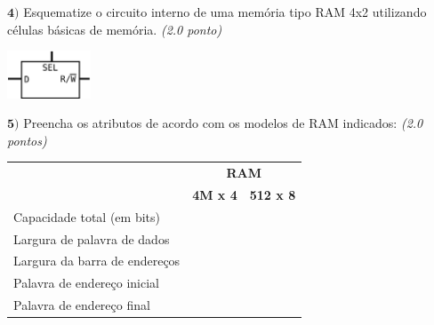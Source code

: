 \documentclass[12pt]{article}
\newcommand{\exerc}[3]{ \vspace*{25pt} {$\mathbf{#1)}$} #2 \hfill {\it #3} }
\begin{document}
\vspace{-30pt}
\exerc{4}{Esquematize o circuito interno de uma memória tipo RAM 4x2
  utilizando células básicas de memória.}{(2.0 ponto)}
  \begin{center}
    \includegraphics[width=25mm]{mem}
  \end{center}

\vspace{-15pt}

\exerc{5}{Preencha os atributos de acordo com os modelos de RAM indicados:}{(2.0 pontos)}
\\
\begin{center}
\begin{tabular}{|l|c|c|}
 \cline{2-3}
 \multicolumn{1}{c|}{} & \multicolumn{2}{c|}{\bf RAM} \\ \cline{2-3}
 \multicolumn{1}{c|}{} & {\bf 4M x 4} & {\bf 512 x 8} \\ \hline
 Capacidade total (em bits) & \phantom{aaaaaaaaaaaaaa} & \phantom{aaaaaaaaaaaaaa} \\ \hline
 Largura de palavra de dados & & \\ \hline
 Largura da barra de endereços & & \\ \hline
 Palavra de endereço inicial & & \\ \hline
 Palavra de endereço final & & \\ \hline
\end{tabular}
\end{center}
\end{document}
